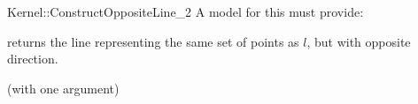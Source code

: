 \begin{ccRefFunctionObjectConcept}{Kernel::ConstructOppositeLine_2}
A model for this must provide:


{returns the line representing the same set of points as $l$,
but with opposite direction.}

\ccRefines
{} (with one argument)

\ccSeeAlso
{} \\

\end{ccRefFunctionObjectConcept}
